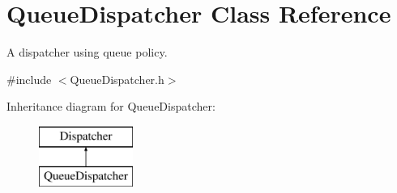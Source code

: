 \hypertarget{class_queue_dispatcher}{\section{Queue\+Dispatcher Class Reference}
\label{class_queue_dispatcher}
}


A dispatcher using queue policy.  




{\ttfamily \#include $<$Queue\+Dispatcher.\+h$>$}

Inheritance diagram for Queue\+Dispatcher\+:\begin{figure}[H]
\begin{center}
\leavevmode
\includegraphics[height=2.000000cm]{class_queue_dispatcher}
\end{center}
\end{figure}
